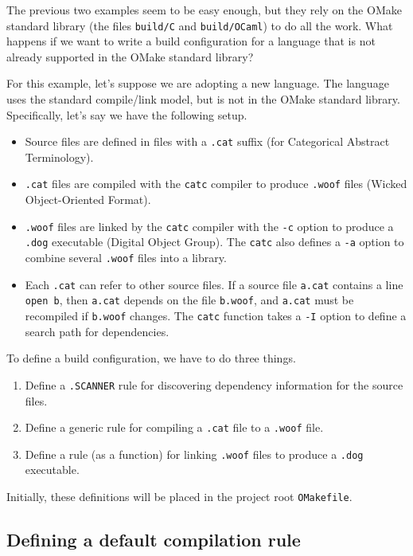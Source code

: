 The previous two examples seem to be easy enough, but they rely on the OMake standard library (the
files \verb+build/C+ and \verb+build/OCaml+) to do all the work.  What happens if we want to write a
build configuration for a language that is not already supported in the OMake standard library?

For this example, let's suppose we are adopting a new language.  The language uses the standard
compile/link model, but is not in the OMake standard library.  Specifically, let's say we have the
following setup.

\begin{itemize}
\item Source files are defined in files with a \verb+.cat+ suffix (for Categorical Abstract Terminology).
\item \verb+.cat+ files are compiled with the \verb+catc+ compiler to produce \verb+.woof+ files
(Wicked Object-Oriented Format).
\item \verb+.woof+ files are linked by the \verb+catc+ compiler with the \verb+-c+ option to produce
a \verb+.dog+ executable (Digital Object Group).  The \verb+catc+ also defines a \verb+-a+ option to
combine several \verb+.woof+ files into a library.
\item Each \verb+.cat+ can refer to other source files.  If a source file \verb+a.cat+ contains a
line \verb+open b+, then \verb+a.cat+ depends on the file \verb+b.woof+, and \verb+a.cat+ must be
recompiled if \verb+b.woof+ changes.  The \verb+catc+ function takes a \verb+-I+ option to define a
search path for dependencies.
\end{itemize}

To define a build configuration, we have to do three things.
\begin{enumerate}
\item Define a \verb+.SCANNER+ rule for discovering dependency information for the source files.
\item Define a generic rule for compiling a \verb+.cat+ file to a \verb+.woof+ file.
\item Define a rule (as a function) for linking \verb+.woof+ files to produce a \verb+.dog+ executable.
\end{enumerate}

Initially, these definitions will be placed in the project root \verb+OMakefile+.

\subsection{Defining a default compilation rule}

